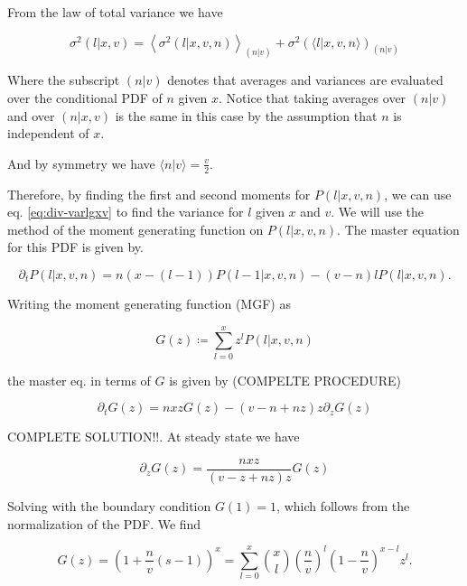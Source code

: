 From the law of total variance we have

\begin{equation}
  \label{eq:div-varlgxv}
  \sigma^2(l|x,v) = \left\langle\sigma^2(l|x,v,n)\right\rangle_{(n|v)}+\sigma^2\left(\langle l|x,v,n\rangle\right)_{(n|v)}
\end{equation}

Where the subscript $(n|v)$ denotes that averages and variances are evaluated over the conditional PDF of $n$ given $x$. Notice that taking averages over $(n|v)$ and over $(n|x,v)$ is the same in this case by the assumption that $n$ is independent of $x$.

And by symmetry we have $\langle n|v\rangle = \frac{v}{2}$.

Therefore, by finding the first and second moments for $P(l|x,v,n)$, we can use eq. \eqref{eq:div-varlgxv} to find the variance for $l$ given $x$ and $v$. We will use the method of the moment generating function on $P(l|x,v,n)$. The master equation for this PDF is given by.

\begin{equation}
  \partial_tP(l|x,v,n) = n(x-(l-1))P(l-1|x,v,n) - (v-n)lP(l|x,v,n).
\end{equation}

Writing the moment generating function (MGF) as

\begin{equation}
  \label{eq:div-Gdef}
  G(z) \coloneqq \sum_{l=0}^xz^lP(l|x,v,n)
\end{equation}

the master eq. in terms of $G$ is given by (COMPELTE PROCEDURE)

\begin{equation*}
  \partial_tG(z) = nxzG(z) - (v-n+nz)z\partial_zG(z)
\end{equation*}

COMPLETE SOLUTION!!. At steady state we have

\begin{equation}
  \partial_zG(z) = \frac{nxz}{(v-z+nz)z}G(z)
\end{equation}

Solving with the boundary condition $G(1) = 1$, which follows from the normalization of the PDF. We find

\begin{equation}
  G(z) = \left(1+\frac{n}{v}\left(s-1\right)\right)^x = \sum_{l=0}^x {x\choose l}\left(\frac{n}{v}\right)^l\left(1-\frac{n}{v}\right)^{x-l}z^l.
\end{equation}

